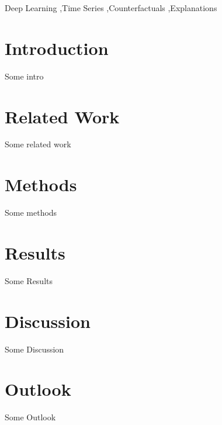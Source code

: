 \documentclass[5p,times]{elsarticle}
\begin{document}
\begin{frontmatter}


\begin{keyword}
Deep Learning \sep Time Series \sep Counterfactuals \sep Explanations%
\end{keyword}

\end{frontmatter}


\section{Introduction}
\label{sec:sample1}
Some intro

\section{Related Work}
\label{sec:related-work}
Some related work

\section{Methods}
\label{sec:methods}
Some methods

\section{Results}
\label{sec:results}
Some Results

\section{Discussion}
\label{sec:discussion}
Some Discussion

\section{Outlook}
\label{sec:outlook}
Some Outlook
\appendix
\end{document}
